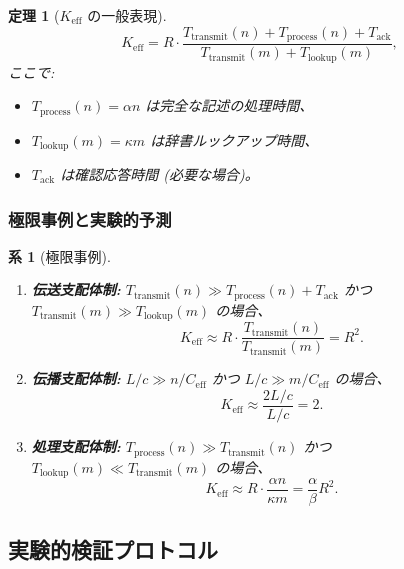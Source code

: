\documentclass[11pt,a4paper]{article}
\newtheorem{theorem}{定理}
\newtheorem{corollary}{系}
\begin{document}
	\begin{theorem}[$K_{\mathrm{eff}}$ の一般表現]
		\label{thm:keff-expression}
		\[
		K_{\mathrm{eff}} = R \cdot \frac{T_{\text{transmit}}(n) + T_{\text{process}}(n) + T_{\text{ack}}}{T_{\text{transmit}}(m) + T_{\text{lookup}}(m)},
		\]
		ここで:
		\begin{itemize}
			\item $T_{\text{process}}(n) = \alpha n$ は完全な記述の処理時間、
			\item $T_{\text{lookup}}(m) = \kappa m$ は辞書ルックアップ時間、
			\item $T_{\text{ack}}$ は確認応答時間 (必要な場合)。
		\end{itemize}
	\end{theorem}
	
	\subsubsection{極限事例と実験的予測}
	
	\begin{corollary}[極限事例]
		\begin{enumerate}
			\item \textbf{伝送支配体制:} $T_{\text{transmit}}(n) \gg T_{\text{process}}(n) + T_{\text{ack}}$ かつ $T_{\text{transmit}}(m) \gg T_{\text{lookup}}(m)$ の場合、
			\[
			K_{\mathrm{eff}} \approx R \cdot \frac{T_{\text{transmit}}(n)}{T_{\text{transmit}}(m)} = R^2.
			\]
			
			\item \textbf{伝播支配体制:} $L/c \gg n/C_{\text{eff}}$ かつ $L/c \gg m/C_{\text{eff}}$ の場合、
			\[
			K_{\mathrm{eff}} \approx \frac{2L/c}{L/c} = 2.
			\]
			
			\item \textbf{処理支配体制:} $T_{\text{process}}(n) \gg T_{\text{transmit}}(n)$ かつ $T_{\text{lookup}}(m) \ll T_{\text{transmit}}(m)$ の場合、
			\[
			K_{\mathrm{eff}} \approx R \cdot \frac{\alpha n}{\kappa m} = \frac{\alpha}{\beta} R^2.
			\]
		\end{enumerate}
	\end{corollary}
	
	\subsection{実験的検証プロトコル}
	
\end{document}
